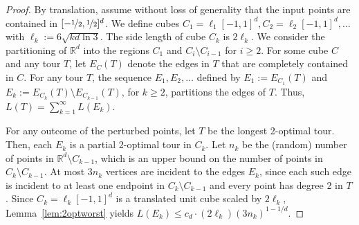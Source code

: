 \documentclass[11pt,DIV=12,a4paper]{scrartcl}
\newcommand{\real}{\ensuremath{\mathbb{R}}}
\begin{document}
\begin{proof}
By translation, assume without loss of generality that the input points are contained in $[-\nicefrac{1}{2},\nicefrac{1}{2}]^d$. We define cubes $C_1=\ell_1[-1,1]^d,C_2=\ell_2[-1,1]^d,\ldots$ with $\ell_k := 6\sqrt{kd\ln 3}$. The side length of cube $C_k$ is $2 \ell_k$.
We consider the partitioning of $\real^d$ into the regions $C_1$ and $C_i \setminus C_{i-1}$ for $i \geq 2$. For some cube $C$ and any tour $T$, let $E_C(T)$ denote the edges in $T$ that are completely contained in $C$. For any tour $T$, the sequence $E_1, E_2, \dots$ defined by $E_1 := E_{C_1}(T)$ and $E_k := E_{C_k}(T) \setminus E_{C_{k-1}}(T)$, for $k\ge 2$, partitions the edges of $T$. Thus, $L(T) = \sum_{k=1}^\infty L(E_k)$.

For any outcome of the perturbed points, let $T$ be the longest 2-optimal tour. Then, each $E_k$ is a partial 2-optimal tour in $C_k$. Let $n_k$ be the (random) number of points in $\real^d \setminus C_{k-1}$, which is an upper bound on the number of points in $C_k\setminus C_{k-1}$. At most $3n_k$ vertices are incident to the edges $E_k$, since each such edge is incident to at least one endpoint in $C_k \setminus C_{k-1}$ and every point has degree 2 in $T$. Since $C_k  = \ell_k [-1,1]^d$ is a translated unit cube scaled by $2\ell_k$, Lemma~\ref{lem:2optworst} yields
$L(E_k) \le c_d\cdot (2\ell_k) (3n_k)^{1-1/d}$.


\end{proof}
\end{document}
